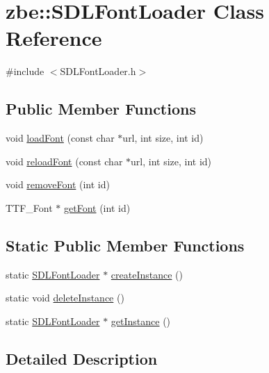 \hypertarget{classzbe_1_1_s_d_l_font_loader}{}\section{zbe\+:\+:S\+D\+L\+Font\+Loader Class Reference}
\label{classzbe_1_1_s_d_l_font_loader}


{\ttfamily \#include $<$S\+D\+L\+Font\+Loader.\+h$>$}

\subsection*{Public Member Functions}
\begin{DoxyCompactItemize}
\item 
void \hyperlink{classzbe_1_1_s_d_l_font_loader_a0a6e10fecc8e6fe5fa419c5ec1aa7e8a}{load\+Font} (const char $\ast$url, int size, int id)
\item 
void \hyperlink{classzbe_1_1_s_d_l_font_loader_a997b0661f40f21fabbae138731ee9661}{reload\+Font} (const char $\ast$url, int size, int id)
\item 
void \hyperlink{classzbe_1_1_s_d_l_font_loader_a095cf2b0d87f453a25a9b25a37516edd}{remove\+Font} (int id)
\item 
T\+T\+F\+\_\+\+Font $\ast$ \hyperlink{classzbe_1_1_s_d_l_font_loader_af238cc377c43f0fe4d9601ee4aabc80b}{get\+Font} (int id)
\end{DoxyCompactItemize}
\subsection*{Static Public Member Functions}
\begin{DoxyCompactItemize}
\item 
static \hyperlink{classzbe_1_1_s_d_l_font_loader}{S\+D\+L\+Font\+Loader} $\ast$ \hyperlink{classzbe_1_1_s_d_l_font_loader_aa6c4b5b2c7338f6c58b6df3973e59c69}{create\+Instance} ()
\item 
static void \hyperlink{classzbe_1_1_s_d_l_font_loader_a62c91e48397c42e78ea18ff052c79e38}{delete\+Instance} ()
\item 
static \hyperlink{classzbe_1_1_s_d_l_font_loader}{S\+D\+L\+Font\+Loader} $\ast$ \hyperlink{classzbe_1_1_s_d_l_font_loader_a5627540479115934fab1832fa0f0e785}{get\+Instance} ()
\end{DoxyCompactItemize}


\subsection{Detailed Description}


